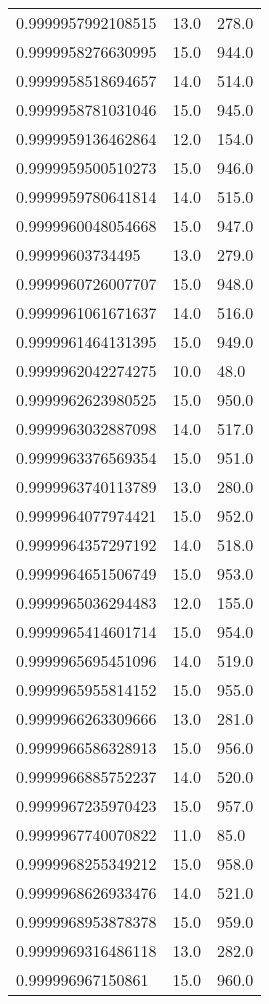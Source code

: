 \begin{center}
\begin{supertabular}[H]{p{0.30\textwidth}p{0.05\textwidth}p{0.05\textwidth}}
0.9999957992108515 & 13.0 & 278.0 \\ 
0.9999958276630995 & 15.0 & 944.0 \\ 
0.9999958518694657 & 14.0 & 514.0 \\ 
0.9999958781031046 & 15.0 & 945.0 \\ 
0.9999959136462864 & 12.0 & 154.0 \\ 
0.9999959500510273 & 15.0 & 946.0 \\ 
0.9999959780641814 & 14.0 & 515.0 \\ 
0.9999960048054668 & 15.0 & 947.0 \\ 
0.99999603734495 & 13.0 & 279.0 \\ 
0.9999960726007707 & 15.0 & 948.0 \\ 
0.9999961061671637 & 14.0 & 516.0 \\ 
0.9999961464131395 & 15.0 & 949.0 \\ 
0.9999962042274275 & 10.0 & 48.0 \\ 
0.9999962623980525 & 15.0 & 950.0 \\ 
0.9999963032887098 & 14.0 & 517.0 \\ 
0.9999963376569354 & 15.0 & 951.0 \\ 
0.9999963740113789 & 13.0 & 280.0 \\ 
0.9999964077974421 & 15.0 & 952.0 \\ 
0.9999964357297192 & 14.0 & 518.0 \\ 
0.9999964651506749 & 15.0 & 953.0 \\ 
0.9999965036294483 & 12.0 & 155.0 \\ 
0.9999965414601714 & 15.0 & 954.0 \\ 
0.9999965695451096 & 14.0 & 519.0 \\ 
0.9999965955814152 & 15.0 & 955.0 \\ 
0.9999966263309666 & 13.0 & 281.0 \\ 
0.9999966586328913 & 15.0 & 956.0 \\ 
0.9999966885752237 & 14.0 & 520.0 \\ 
0.9999967235970423 & 15.0 & 957.0 \\ 
0.9999967740070822 & 11.0 & 85.0 \\ 
0.9999968255349212 & 15.0 & 958.0 \\ 
0.9999968626933476 & 14.0 & 521.0 \\ 
0.9999968953878378 & 15.0 & 959.0 \\ 
0.9999969316486118 & 13.0 & 282.0 \\ 
0.999996967150861 & 15.0 & 960.0 \\ 

\end{supertabular}
\end{center}
